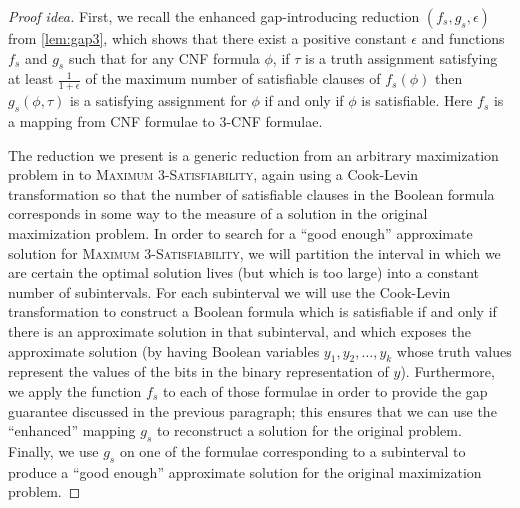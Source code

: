 \documentclass[]{article}
\newenvironment{proofidea}{\begin{proof}[Proof idea]}{\end{proof}}
\begin{document}
\begin{proofidea}
  First, we recall the enhanced gap-introducing reduction $(f_s, g_s, \epsilon)$ from \autoref{lem:gap3}, which shows that there exist a positive constant $\epsilon$ and functions $f_s$ and $g_s$ such that for any CNF formula $\phi$, if $\tau$ is a truth assignment satisfying at least $\frac{1}{1 + \epsilon}$ of the maximum number of satisfiable clauses of $f_s(\phi)$ then $g_s(\phi, \tau)$ is a satisfying assignment for $\phi$ if and only if $\phi$ is satisfiable.
  Here $f_s$ is a mapping from CNF formulae to 3-CNF formulae.

  The reduction we present is a generic reduction from an arbitrary maximization problem in \APX{} to \textsc{Maximum 3-Satisfiability}, again using a Cook-Levin transformation so that the number of satisfiable clauses in the Boolean formula corresponds in some way to the measure of a solution in the original maximization problem.
  In order to search for a ``good enough'' approximate solution for \textsc{Maximum 3-Satisfiability}, we will partition the interval in which we are certain the optimal solution lives (but which is too large) into a constant number of subintervals.
  For each subinterval we will use the Cook-Levin transformation to construct a Boolean formula which is satisfiable if and only if there is an approximate solution in that subinterval, and which exposes the approximate solution (by having Boolean variables $y_1, y_2, \dotsc, y_k$ whose truth values represent the values of the bits in the binary representation of $y$).
  Furthermore, we apply the function $f_s$ to each of those formulae in order to provide the gap guarantee discussed in the previous paragraph; this ensures that we can use the ``enhanced'' mapping $g_s$ to reconstruct a solution for the original problem.
  Finally, we use $g_s$ on one of the formulae corresponding to a subinterval to produce a ``good enough'' approximate solution for the original maximization problem.
\end{proofidea}
\end{document}
